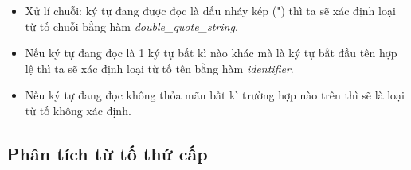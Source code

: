 \begin{itemize}
  
 
  
  \item Xử lí chuỗi: ký tự đang được đọc là dấu nháy kép (") thì ta sẽ xác định loại từ tố chuỗi bằng hàm \textit{double\_quote\_string}. 
  
  
  
  
  \item Nếu ký tự đang đọc là 1 ký tự bất kì nào khác mà là ký tự bắt đầu tên hợp lệ thì ta sẽ xác định loại từ tố tên bằng hàm \textit{identifier}. 
  
  
  
  
  \item Nếu ký tự đang đọc không thỏa mãn bất kì trường hợp nào trên thì sẽ là loại từ tố không xác định.
  
  
  
\end{itemize}

\subsection{Phân tích từ tố thứ cấp}

